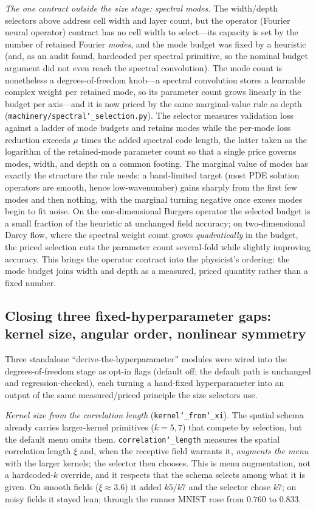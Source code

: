 \documentclass[11pt]{article}
\newcommand{\allowbreakhere}{\discretionary{}{}{}}
\newcommand{\code}[1]{\texttt{\def\_{\char`_\allowbreakhere}#1}}
\begin{document}
\emph{The one contract outside the size stage: spectral modes.} The width/depth selectors above address cell
width and layer count, but the operator (Fourier neural operator) contract has no cell width to select---its
capacity is set by the number of retained Fourier \emph{modes}, and the mode budget was fixed by a heuristic
(and, as an audit found, hardcoded per spectral primitive, so the nominal budget argument did not even reach
the spectral convolution). The mode count is nonetheless a degrees-of-freedom knob---a spectral convolution
stores a learnable complex weight per retained mode, so its parameter count grows linearly in the budget per
axis---and it is now priced by the same marginal-value rule as depth (\code{machinery/spectral\_selection.py}).
The selector measures validation loss against a ladder of mode budgets and retains modes while the per-mode
loss reduction exceeds $\mu$ times the added spectral code length, the latter taken as the logarithm of the
retained-mode parameter count so that a single price governs modes, width, and depth on a common footing. The
marginal value of modes has exactly the structure the rule needs: a band-limited target (most PDE solution
operators are smooth, hence low-wavenumber) gains sharply from the first few modes and then nothing, with the
marginal turning negative once excess modes begin to fit noise. On the one-dimensional Burgers operator the
selected budget is a small fraction of the heuristic at unchanged field accuracy; on two-dimensional Darcy
flow, where the spectral weight count grows \emph{quadratically} in the budget, the priced selection cuts the
parameter count several-fold while slightly improving accuracy. This brings the operator contract into the
physicist's ordering: the mode budget joins width and depth as a measured, priced quantity rather than a fixed
number.

\subsection{Closing three fixed-hyperparameter gaps: kernel size, angular order, nonlinear symmetry}
\label{sec:orphans}

Three standalone ``derive-the-hyperparameter'' modules were wired into the degrees-of-freedom stage as opt-in
flags (default off; the default path is unchanged and regression-checked), each turning a hand-fixed
hyperparameter into an output of the same measured/priced principle the size selectors use.

\emph{Kernel size from the correlation length} (\code{kernel\_from\_xi}). The spatial schema already
carries larger-kernel primitives ($k=5,7$) that compete by selection, but the default menu omits them.
\code{correlation\_length} measures the spatial correlation length $\xi$ and, when the receptive field
warrants it, \emph{augments the menu} with the larger kernels; the selector then chooses. This is menu
augmentation, not a hardcoded-$k$ override, and it respects that the schema selects among what it is given.
On smooth fields ($\xi\approx3.6$) it added $k5/k7$ and the selector chose $k7$; on noisy fields it stayed
lean; through the runner MNIST rose from $0.760$ to $0.833$.
\end{document}
